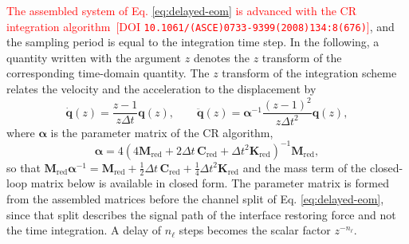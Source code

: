 \documentclass[11pt,a4paper]{article}
\numberwithin{equation}{section}
\newcommand{\rev}[1]{\textcolor{red}{#1}}
\begin{document}
\rev{The assembled system of Eq. \eqref{eq:delayed-eom} is advanced with the CR integration algorithm} \cite{ChenRicles2008b}\,\rev{[DOI \nolinkurl{10.1061/(ASCE)0733-9399(2008)134:8(676)}]}, and the sampling period is equal to the integration time step. In the following, a quantity written with the argument \(z\) denotes the \(z\) transform of the corresponding time-domain quantity. The \(z\) transform of the integration scheme relates the velocity and the acceleration to the displacement by
\begin{equation}
	\dot{\bm{q}}(z)=\frac{z-1}{z\Delta t}\bm{q}(z),
	\qquad
	\ddot{\bm{q}}(z)=\bm{\alpha}^{-1}\frac{(z-1)^{2}}{z\Delta t^{2}}\bm{q}(z),
	\label{eq:z-derivatives}
\end{equation}
where \(\bm{\alpha}\) is the parameter matrix of the CR algorithm,
\begin{equation}
	\bm{\alpha}=4\left(4\mathbf{M}_{\mathrm{red}}
	+2\Delta t\,\mathbf{C}_{\mathrm{red}}
	+\Delta t^{2}\mathbf{K}_{\mathrm{red}}\right)^{-1}\mathbf{M}_{\mathrm{red}},
	\label{eq:cr-parameter}
\end{equation}
so that \(\mathbf{M}_{\mathrm{red}}\bm{\alpha}^{-1}
=\mathbf{M}_{\mathrm{red}}+\tfrac{1}{2}\Delta t\,\mathbf{C}_{\mathrm{red}}
+\tfrac{1}{4}\Delta t^{2}\mathbf{K}_{\mathrm{red}}\) and the mass term of the closed-loop matrix below is available in closed form. The parameter matrix is formed from the assembled matrices before the channel split of Eq. \eqref{eq:delayed-eom}, since that split describes the signal path of the interface restoring force and not the time integration. A delay of \(n_{\ell}\) steps becomes the scalar factor \(z^{-n_{\ell}}\).
\end{document}
